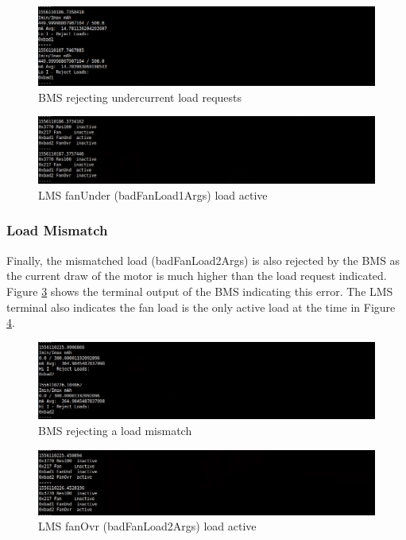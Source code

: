 \documentclass[11pt,conference,draftcls,onecolumn]{IEEEtran}
\begin{document}
\begin{figure}[!htbp]
    \centering
    \includegraphics[width=6.5in]{img/iUnder.png}
    \caption{BMS rejecting undercurrent load requests}
    \label{fig:iUnder}
\end{figure}
\begin{figure}[!htbp]
    \centering
    \includegraphics[width=6.5in]{img/badFan1Active.png}
    \caption{LMS fanUnder (badFanLoad1Args) load active}
    \label{fig:badFan1Active}
\end{figure}

\subsubsection{Load Mismatch}
Finally, the mismatched load (badFanLoad2Args) is also rejected by the BMS as the current draw of the motor is much higher than the load request indicated.
Figure \ref{fig:iOver} shows the terminal output of the BMS indicating this error.
The LMS terminal also indicates the fan load is the only active load at the time in Figure \ref{fig:badFan2Active}.

\begin{figure}[!htbp]
    \centering
    \includegraphics[width=6.5in]{img/iOver.png}
    \caption{BMS rejecting a load mismatch}
    \label{fig:iOver}
\end{figure}
\begin{figure}[!htbp]
    \centering
    \includegraphics[width=6.5in]{img/badFan2Active.png}
    \caption{LMS fanOvr (badFanLoad2Args) load active}
    \label{fig:badFan2Active}
\end{figure}
\end{document}
